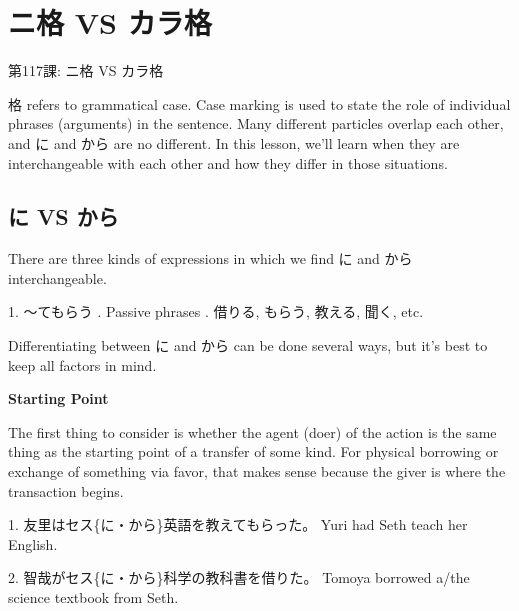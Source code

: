     
\chapter{ニ格 VS カラ格}

\begin{center}
\begin{Large}
第117課: ニ格 VS カラ格 
\end{Large}
\end{center}
 
\par{ 格 refers to grammatical case. Case marking is used to state the role of individual phrases (arguments) in the sentence. Many different particles overlap each other, and に and から are no different. In this lesson, we'll learn when they are interchangeable with each other and how they differ in those situations. }
      
\section{に VS から}
 
\par{ There are three kinds of expressions in which we find に and から interchangeable. }

\par{1. ～てもらう \hfill{}. Passive phrases \hfill{}. 借りる, もらう, 教える, 聞く, etc. }

\par{ Differentiating between に and から can be done several ways, but it's best to keep all factors in mind. }

\begin{center}
\textbf{Starting Point }
\end{center}

\par{ The first thing to consider is whether the agent (doer) of the action is the same thing as the starting point of a transfer of some kind. For physical borrowing or exchange of something via favor, that makes sense because the giver is where the transaction begins. }

\par{1. 友里はセス\{に・から\}英語を教えてもらった。 \hfill\break
Yuri had Seth teach her English. }

\par{2. 智哉がセス\{に・から\}科学の教科書を借りた。 \hfill\break
Tomoya borrowed a\slash the science textbook from Seth. }

